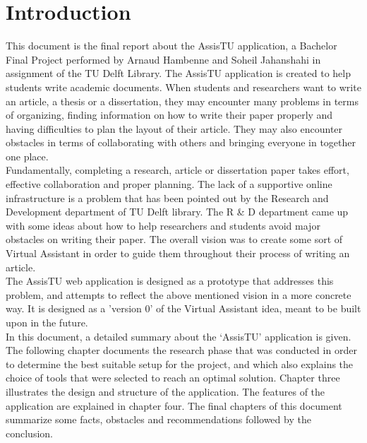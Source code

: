 \chapter{Introduction}

This document is the final report about the AssisTU application, a Bachelor Final Project performed by Arnaud Hambenne and Soheil Jahanshahi in
assignment of the TU Delft Library. 
The AssisTU application is created to help students write academic documents. When students and researchers want to write an article, a thesis or a 
dissertation, they may encounter many problems in terms of organizing, finding information on how to write their paper properly and having difficulties 
to plan the layout of their article. They may also encounter obstacles in terms of collaborating with others and bringing everyone in together one 
place. \\

Fundamentally, completing a research, article or dissertation paper takes effort, effective collaboration and proper planning. The lack of a supportive
online infrastructure is a problem that has been pointed out by the Research and Development department of TU Delft library. The R \& D department came 
up with some ideas about how to help researchers and students avoid major obstacles on writing their paper. The overall vision was to create some sort 
of Virtual Assistant in order to guide them throughout their process of writing an article.\\

The AssisTU web application is designed as a prototype that addresses this problem, and attempts to reflect the above mentioned vision in a more 
concrete way. It is designed as a 'version 0' of the Virtual Assistant idea, meant to be built upon in the future.\\ 

In this document, a detailed summary about the `AssisTU' application is given. The following chapter documents the research phase that was conducted in 
order to determine the best suitable setup for the project, and which also explains the choice of tools that were selected to reach an optimal solution. 
Chapter three illustrates the design and structure of the application. The features of the application are explained in chapter four. The final chapters 
of this document summarize some facts, obstacles and recommendations followed by the conclusion.  